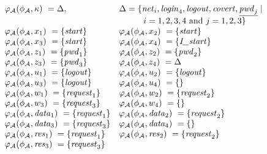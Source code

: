 \documentclass[10pt,a4paper,final,oneside,fleqn]{book}
\begin{document}
\noindent
$\begin{array}{ll}
\varphi_\mathcal{A}(\phi_\mathcal{A},\kappa)~=\Delta,&\Delta=\{\mbox{{\itshape net\/}}_i, \mbox{{\itshape login\/}}_4, \mbox{{\itshape logout\/}}, \mbox{{\itshape covert\/}},\underline{\mbox{{\itshape pwd\/}}_j}\mid\\
&\hspace{10mm}i=1,2,3,4\mbox{ and }j=1,2,3\}\\
\varphi_\mathcal{A}(\phi_\mathcal{A},x_1)~=\{\mbox{{\itshape start\/}}\}& \varphi_\mathcal{A}(\phi_\mathcal{A},x_2)~=\{\mbox{{\itshape start\/}}\}\\
\varphi_\mathcal{A}(\phi_\mathcal{A},x_3)~=\{\mbox{{\itshape start\/}}\}&\varphi_\mathcal{A}(\phi_\mathcal{A},x_4)~=\{\mbox{{\itshape I\_start\/}}\}\\
\varphi_\mathcal{A}(\phi_\mathcal{A},z_1)~=\{\mbox{{\itshape pwd\/}}_1\}&\varphi_\mathcal{A}(\phi_\mathcal{A},z_2)~=\{\mbox{{\itshape pwd\/}}_2\}\\
\varphi_\mathcal{A}(\phi_\mathcal{A},z_3)~=\{\mbox{{\itshape pwd\/}}_3\}&\varphi_\mathcal{A}(\phi_\mathcal{A},z_4)~=\Delta\\
\varphi_\mathcal{A}(\phi_\mathcal{A},u_1)~=\{\mbox{{\itshape logout\/}}\}&\varphi_\mathcal{A}(\phi_\mathcal{A},u_2)~=\{\mbox{{\itshape logout\/}}\}\\
\varphi_\mathcal{A}(\phi_\mathcal{A},u_3)~=\{\mbox{{\itshape logout\/}}\}&\varphi_\mathcal{A}(\phi_\mathcal{A},u_4)~=\{\}\\
\varphi_\mathcal{A}(\phi_\mathcal{A},w_1)~=\{\mbox{{\itshape request\/}}_1\}&\varphi_\mathcal{A}(\phi_\mathcal{A},w_2)~=\{\mbox{{\itshape request\/}}_2\}\\
\varphi_\mathcal{A}(\phi_\mathcal{A},w_3)~=\{\mbox{{\itshape request\/}}_3\}&\varphi_\mathcal{A}(\phi_\mathcal{A},w_4)~=\{\}\\
\varphi_\mathcal{A}(\phi_\mathcal{A},\mbox{{\itshape data\/}}_1)~=\{\mbox{{\itshape request\/}}_1\}&\varphi_\mathcal{A}(\phi_\mathcal{A},\mbox{{\itshape data\/}}_2)~=\{\mbox{{\itshape request\/}}_2\}\\
\varphi_\mathcal{A}(\phi_\mathcal{A},\mbox{{\itshape data\/}}_3)~=\{\mbox{{\itshape request\/}}_3\}&\varphi_\mathcal{A}(\phi_\mathcal{A},\mbox{{\itshape data\/}}_4)~=\{\}\\
\varphi_\mathcal{A}(\phi_\mathcal{A},\mbox{{\itshape res\/}}_1)~=\{\mbox{{\itshape request\/}}_1\}&\varphi_\mathcal{A}(\phi_\mathcal{A},\mbox{{\itshape res\/}}_2)~=\{\mbox{{\itshape request\/}}_2\}\\
\varphi_\mathcal{A}(\phi_\mathcal{A},\mbox{{\itshape res\/}}_3)~=\{\mbox{{\itshape request\/}}_3\}
\end{array}$\vspace{6mm}
\end{document}
